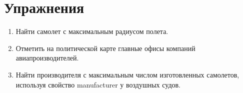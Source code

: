 




\section{Упражнения}
\begin{enumerate}
\item Найти самолет с максимальным радиусом полета.
\item Отметить на политической карте главные офисы компаний авиапроизводителей.
\item Найти производителя с максимальным числом изготовленных самолетов, используя свойство manufacturer у воздушных судов.
\end{enumerate}
